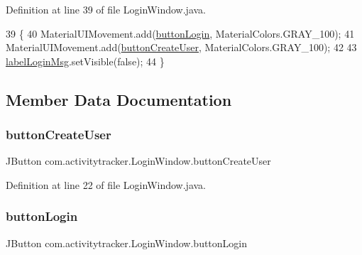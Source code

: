 Definition at line 39 of file Login\+Window.\+java.


\begin{DoxyCode}
39                            \{
40         MaterialUIMovement.add(\mbox{\hyperlink{classcom_1_1activitytracker_1_1_login_window_ac77d9f8f3a6c697a9847ecd130ac2ef6}{buttonLogin}}, MaterialColors.GRAY\_100);
41         MaterialUIMovement.add(\mbox{\hyperlink{classcom_1_1activitytracker_1_1_login_window_a1ff77d6846d01d4a8540371ede091371}{buttonCreateUser}}, MaterialColors.GRAY\_100);
42 
43         \mbox{\hyperlink{classcom_1_1activitytracker_1_1_login_window_a567ae49b39c07840b39eec92fdf92c22}{labelLoginMsg}}.setVisible(\textcolor{keyword}{false});
44     \}
\end{DoxyCode}


\subsection{Member Data Documentation}
\mbox{\label{classcom_1_1activitytracker_1_1_login_window_a1ff77d6846d01d4a8540371ede091371}} 
\subsubsection{\texorpdfstring{button\+Create\+User}{buttonCreateUser}}
{\footnotesize\ttfamily J\+Button com.\+activitytracker.\+Login\+Window.\+button\+Create\+User\hspace{0.3cm}{\ttfamily [private]}}



Definition at line 22 of file Login\+Window.\+java.

\mbox{\label{classcom_1_1activitytracker_1_1_login_window_ac77d9f8f3a6c697a9847ecd130ac2ef6}} 
\subsubsection{\texorpdfstring{button\+Login}{buttonLogin}}
{\footnotesize\ttfamily J\+Button com.\+activitytracker.\+Login\+Window.\+button\+Login\hspace{0.3cm}{\ttfamily [private]}}



